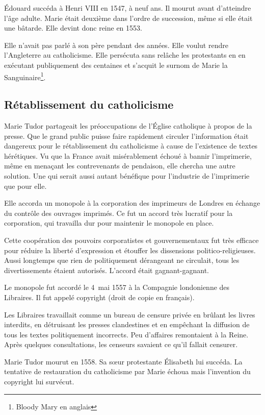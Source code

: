 Édouard succéda à Henri VIII en 1547, à neuf ans. Il mourut avant d'atteindre l'âge adulte. Marie était deuxième dans l'ordre de succession, même si elle était une bâtarde. Elle devint donc reine en
1553.

Elle n'avait pas parlé à son père pendant des années. Elle voulut rendre l'Angleterre au catholicisme. Elle persécuta sans relâche les protestants en en exécutant publiquement des centaines et
s'acquit le surnom de Marie la Sanguinaire\footnote{Bloody Mary en anglais}.
\subsection{Rétablissement du catholicisme}
Marie Tudor partageait les préoccupations de l'Église catholique à propos de la presse. Que le grand public puisse faire rapidement circuler l'information était dangereux pour le rétablissement du
catholicisme à cause de l'existence de textes hérétiques. Vu que la France avait misérablement échoué à bannir l'imprimerie, même en menaçant les contrevenants de pendaison, elle chercha une autre
solution. Une qui serait aussi autant bénéfique pour l'industrie de l'imprimerie que pour elle.

Elle accorda un monopole à la corporation des imprimeurs de Londres en échange du contrôle des ouvrages imprimés. Ce fut un accord très lucratif pour la corporation, qui travailla dur pour maintenir
le monopole en place. 

Cette coopération des pouvoirs corporatistes et gouvernementaux fut très efficace pour réduire la liberté d'expression et étouffer les dissensions politico-religieuses. Aussi
longtemps que rien de politiquement dérangeant ne circulait, tous les divertissements étaient autorisés. L'accord était gagnant-gagnant.

Le monopole fut accordé le 4 mai 1557 à la Compagnie londonienne des Libraires. Il fut appelé copyright (droit de copie en français).

Les Libraires travaillait comme un bureau de censure privée en brûlant les livres interdits, en détruisant les presses clandestines et en empêchant la diffusion de tous les textes politiquement
incorrects. Peu d'affaires remontaient à la Reine. Après quelques consultations, les censeurs savaient ce qu'il fallait censurer.

Marie Tudor mourut en 1558. Sa sœur protestante Élisabeth lui succéda. La tentative de restauration du catholicisme par Marie échoua mais l'invention du copyright lui survécut. 

